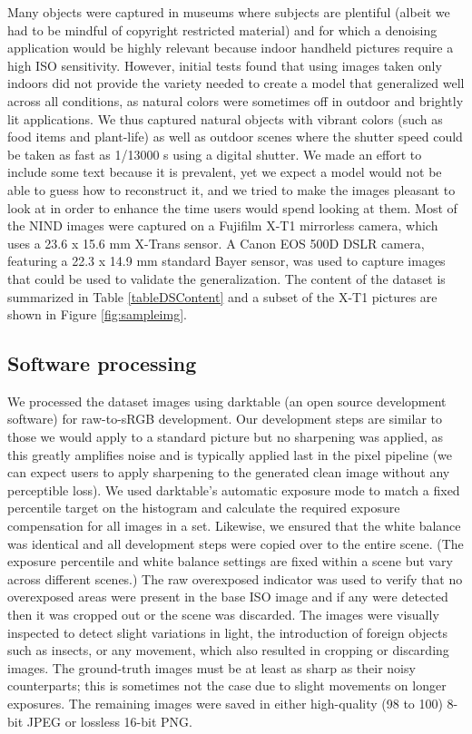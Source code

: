 Many objects were captured in museums where subjects are plentiful (albeit we had to be mindful of copyright restricted material) and for which a denoising application would be highly relevant because indoor handheld pictures require a high ISO sensitivity. However, initial tests found that using images taken only indoors did not provide the variety needed to create a model that generalized well across all conditions, as natural colors were sometimes off in outdoor and brightly lit applications. We thus captured natural objects with vibrant colors (such as food items and plant-life) as well as outdoor scenes where the shutter speed could be taken as fast as 1/13000 s using a digital shutter. We made an effort to include some text because it is prevalent, yet we expect a model would not be able to guess how to reconstruct it, and we tried to make the images pleasant to look at in order to enhance the time users would spend looking at them. Most of the NIND images were captured on a Fujifilm X-T1 mirrorless camera, which uses a 23.6 x 15.6 mm X-Trans sensor. A Canon EOS 500D DSLR camera, featuring a 22.3 x 14.9 mm standard Bayer sensor, was used to capture images that could be used to validate the generalization. The content of the dataset is summarized in Table \ref{tableDSContent} and a subset of the X-T1 pictures are shown in Figure \ref{fig:sampleimg}.
\subsection{Software processing}
We processed the dataset images using darktable \cite{darktable} (an open source development software) for raw-to-sRGB development. Our development steps are similar to those we would apply to a standard picture but no sharpening was applied, as this greatly amplifies noise and is typically applied last in the pixel pipeline (we can expect users to apply sharpening to the generated clean image without any perceptible loss). We used darktable's automatic exposure mode to match a fixed percentile target on the histogram and calculate the required exposure compensation for all images in a set. Likewise, we ensured that the white balance was identical and all development steps were copied over to the entire scene. (The exposure percentile and white balance settings are fixed within a scene but vary across different scenes.) The raw overexposed indicator was used to verify that no overexposed areas were present in the base ISO image and if any were detected then it was cropped out or the scene was discarded. The images were visually inspected to detect slight variations in light, the introduction of foreign objects such as insects, or any movement, which also resulted in cropping or discarding images. The ground-truth images must be at least as sharp as their noisy counterparts; this is sometimes not the case due to slight movements on longer exposures. The remaining images were saved in either high-quality (98 to 100) 8-bit JPEG or lossless 16-bit PNG.

